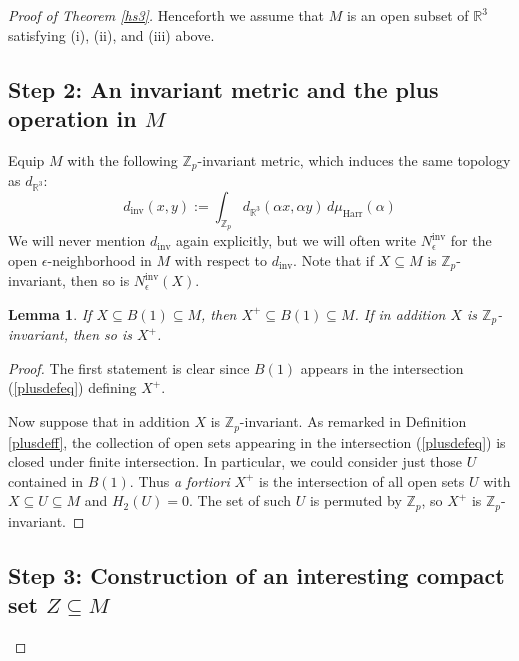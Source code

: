 \documentclass[12pt]{article}
\theoremstyle{plain}
\newtheorem{lemma}[theorem]{Lemma}
\theoremstyle{definition}
\theoremstyle{remark}
\numberwithin{equation}{section}
\begin{document}
\begin{proof}[Proof of Theorem \ref{hs3}]
Henceforth we assume that $M$ is an open subset of $\mathbb R^3$ satisfying (i), (ii), and (iii) above.

\subsection{Step 2: An invariant metric and the plus operation in $M$}\label{invmetricsec}

Equip $M$ with the following $\mathbb Z_p$-invariant metric, which induces the same topology as $d_{\mathbb R^3}$:
\begin{equation}
d_{\operatorname{inv}}(x,y):=\int_{\mathbb Z_p}d_{\mathbb R^3}(\alpha x,\alpha y)\,d\mu_{\operatorname{Harr}}(\alpha)
\end{equation}
We will never mention $d_{\operatorname{inv}}$ again explicitly, but we will often write $N^{\operatorname{inv}}_\epsilon$ for the open $\epsilon$-neighborhood in $M$ with respect to $d_{\operatorname{inv}}$.  Note that if $X\subseteq M$ is $\mathbb Z_p$-invariant, then so is $N^{\operatorname{inv}}_\epsilon(X)$.

\begin{lemma}\label{plusinvariant}
If $X\subseteq B(1)\subseteq M$, then $X^+\subseteq B(1)\subseteq M$.  If in addition $X$ is $\mathbb Z_p$-invariant, then so is $X^+$.
\end{lemma}

\begin{proof}
The first statement is clear since $B(1)$ appears in the intersection (\ref{plusdefeq}) defining $X^+$.

Now suppose that in addition $X$ is $\mathbb Z_p$-invariant.  As remarked in Definition \ref{plusdeff}, the collection of open sets appearing in the intersection (\ref{plusdefeq}) is closed under finite intersection.  In particular, we could consider just those $U$ contained in $B(1)$.  Thus \emph{a fortiori} $X^+$ is the intersection of all open sets $U$ with $X\subseteq U\subseteq M$ and $H_2(U)=0$.  The set of such $U$ is permuted by $\mathbb Z_p$, so $X^+$ is $\mathbb Z_p$-invariant.
\end{proof}

\subsection{Step 3: Construction of an interesting compact set $Z\subseteq M$}\label{constructZsec}


\end{proof}
\end{document}
